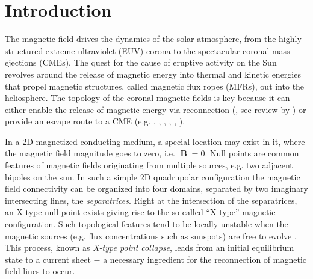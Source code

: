 \documentclass[preprint]{aastex}
\begin{document}
\section{Introduction}
The magnetic field drives the dynamics of the solar atmosphere, from the highly structured extreme ultraviolet (EUV) corona to the spectacular coronal mass ejections (CMEs). The quest for the cause of eruptive activity on the Sun revolves around the release of magnetic energy into thermal and kinetic energies that propel magnetic structures, called magnetic flux ropes (MFRs), out into the heliosphere. The topology of the coronal magnetic fields is key because it can either enable the release of magnetic energy via reconnection (\citealt{Priest_Demoulin_1995}, see review by \citealt{Longcope_2005}) or provide an escape route to a CME (e.g. \citealt{Antiochos_etal_1999}, \citealt{Aulanier_etal_2000}, \citealt{Lugaz_etal_2011}, \citealt{Sun_etal_2012b}, \citealt{Sun_etal_2013},  \citealt{Jiang_etal_2013}). 

In a 2D magnetized conducting medium, a special location may exist in it, where the magnetic field magnitude goes to zero, i.e. $|\textbf{B}|=0$. Null points are common features of magnetic fields originating from multiple sources, e.g. two adjacent bipoles on the sun. In such a simple 2D quadrupolar configuration the magnetic field connectivity can be organized into four domains, separated by two imaginary intersecting lines, the \emph{separatrices}. Right at the intersection of the separatrices, an X-type null point exists giving rise to the so-called ``X-type'' magnetic configuration. Such topological features tend to be locally unstable when the magnetic sources (e.g. flux concentrations such as sunspots) are free to evolve \citep{Dungey_1953}. This process, known as \emph{X-type point collapse}, leads from an initial equilibrium state to a current sheet $-$ a necessary ingredient for the reconnection of magnetic field lines to occur.
\end{document}
